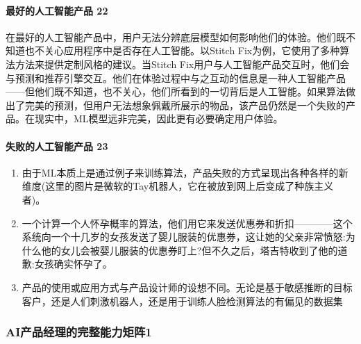 \documentclass[letterpaper,11pt,english]{sphinxmanual}
\begin{document}
\paragraph{最好的人工智能产品 22\sphinxfootnotemark[103]}
\label{\detokenize{chapter_introduction/AI_PM:id31}}%
\begin{footnotetext}[103]\sphinxAtStartFootnote
{}
%
\end{footnotetext}\ignorespaces 
在最好的人工智能产品中，用户无法分辨底层模型如何影响他们的体验。他们既不知道也不关心应用程序中是否存在人工智能。以Stitch
Fix为例，它使用了多种算法方法来提供定制风格的建议。当Stitch
Fix用户与人工智能产品交互时，他们会与预测和推荐引擎交互。他们在体验过程中与之互动的信息是一种人工智能产品——但他们既不知道，也不关心，他们所看到的一切背后是人工智能。如果算法做出了完美的预测，但用户无法想象佩戴所展示的物品，该产品仍然是一个失败的产品。在现实中，ML模型远非完美，因此更有必要确定用户体验。


\paragraph{失败的人工智能产品 23\sphinxfootnotemark[104]}
\label{\detokenize{chapter_introduction/AI_PM:id32}}%
\begin{footnotetext}[104]\sphinxAtStartFootnote
{}
%
\end{footnotetext}\ignorespaces \begin{enumerate}
%
\item {} 
由于ML本质上是通过例子来训练算法，产品失败的方式呈现出各种各样的新维度(这里的图片是微软的Tay机器人，它在被放到网上后变成了种族主义者)。

\item {} 
一个计算一个人怀孕概率的算法，他们用它来发送优惠券和折扣————这个系统向一个十几岁的女孩发送了婴儿服装的优惠券，这让她的父亲非常愤怒:为什么他的女儿会被婴儿服装的优惠券盯上?但不久之后，塔吉特收到了他的道歉:女孩确实怀孕了。

\item {} 
产品的使用或应用方式与产品设计师的设想不同。无论是基于敏感推断的目标客户，还是人们刺激机器人，还是用于训练人脸检测算法的有偏见的数据集

\end{enumerate}


\subsubsection{AI产品经理的完整能力矩阵1\sphinxfootnotemark[105]}
\label{\detokenize{chapter_introduction/ability:ai1}}\label{\detokenize{chapter_introduction/ability::doc}}%
\begin{footnotetext}[105]\sphinxAtStartFootnote
{}
%
\end{footnotetext}\ignorespaces 
\end{document}
